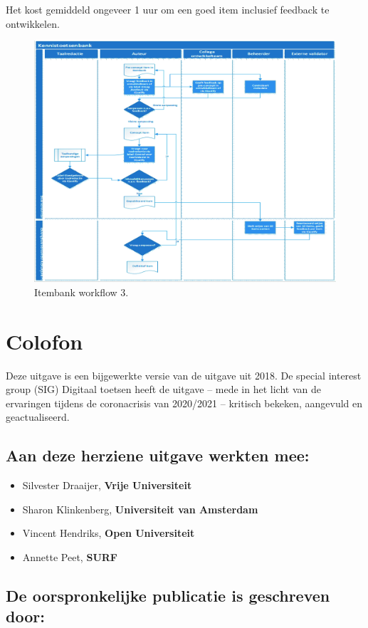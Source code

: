 \documentclass[
]{book}
\providecommand{\tightlist}{%
  \setlength{\itemsep}{0pt}\setlength{\parskip}{0pt}}
\begin{document}
Het kost gemiddeld ongeveer 1 uur om een goed item inclusief feedback te ontwikkelen.

\begin{figure}
\includegraphics[width=0.6\linewidth]{images/kennistoetsenbank} \caption{Itembank workflow 3.}\label{fig:unnamed-chunk-13}
\end{figure}

\hypertarget{colofon}{%
\chapter{Colofon}\label{colofon}}

Deze uitgave is een bijgewerkte versie van de uitgave uit 2018. De special interest group (SIG) Digitaal toetsen heeft de uitgave -- mede in het licht van de ervaringen tijdens de coronacrisis van 2020/2021 -- kritisch bekeken, aangevuld en geactualiseerd.

\hypertarget{aan-deze-herziene-uitgave-werkten-mee}{%
\section{Aan deze herziene uitgave werkten mee:}\label{aan-deze-herziene-uitgave-werkten-mee}}

\begin{itemize}
\tightlist
\item
  Silvester Draaijer, \textbf{Vrije Universiteit}
\item
  Sharon Klinkenberg, \textbf{Universiteit van Amsterdam}
\item
  Vincent Hendriks, \textbf{Open Universiteit}
\item
  Annette Peet, \textbf{SURF}
\end{itemize}

\hypertarget{de-oorspronkelijke-publicatie-is-geschreven-door}{%
\section{De oorspronkelijke publicatie is geschreven door:}\label{de-oorspronkelijke-publicatie-is-geschreven-door}}
\end{document}
